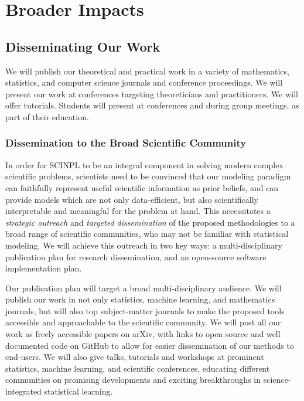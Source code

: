 \documentclass[11pt]{NSFamsart}
\newcommand{\cmtS}[1]{{\color{blue}{(Simon: #1)}}}
\begin{document}
\section{Broader Impacts}


\subsection{Disseminating Our Work} We will publish our theoretical and practical work in a variety of mathematics, statistics, and computer science journals and conference proceedings. We will present our work at conferences targeting theoreticians and practitioners.  We will offer tutorials.  Students will present at conferences and during group meetings, as part of their education. \cmtS{expand and discuss cross-disciplinary dissemination to the broad scientific community? some sample writing below from another proposal}

\subsubsection*{Dissemination to the Broad Scientific Community}
In order for SCINPL to be an integral component in solving modern complex scientific problems, scientists need to be convinced that our modeling paradigm can faithfully represent useful scientific information as prior beliefs, and can provide models which are not only data-efficient, but also scientifically interpretable and meaningful for the problem at hand. This necessitates a \textit{strategic outreach} and \textit{targeted dissemination} of the proposed methodologies to a broad range of scientific communities, who may not be familiar with statistical modeling. We will achieve this outreach in two key ways: a multi-disciplinary publication plan for research dissemination, and an open-source software implementation plan. 

Our publication plan will target a broad multi-disciplinary audience. We will publish our work in not only statistics, machine learning, and mathematics journals, but will also top subject-matter journals to make the proposed tools accessible and approachable to the scientific community. We will post all our work as freely accessible papers on arXiv, with links to open source and well documented code on GitHub to allow for easier dissemination of our methods to end-users. We will also give talks, tutorials and workshops at prominent statistics, machine learning, and scientific conferences, educating different communities on promising developments and exciting breakthroughs in science-integrated statistical learning.
\end{document}
